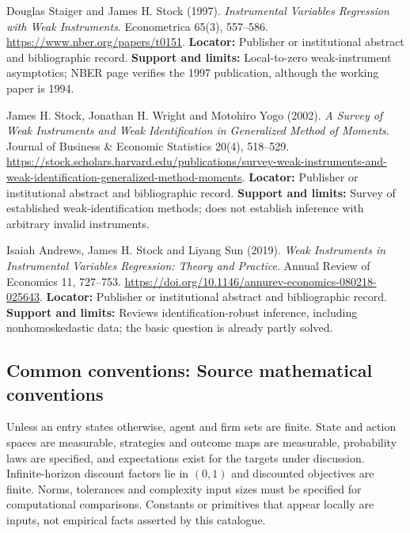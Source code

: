 \documentclass[11pt,a4paper]{article}
\begin{document}
\begin{enumerate}[label={[\textnormal{S}\arabic*]},leftmargin=*]

\item Douglas Staiger and James H. Stock (1997). \emph{Instrumental Variables Regression with Weak Instruments}. Econometrica 65(3), 557–586. \url{https://www.nber.org/papers/t0151}. \textbf{Locator:} Publisher or institutional abstract and bibliographic record. \textbf{Support and limits:} Local-to-zero weak-instrument asymptotics; NBER page verifies the 1997 publication, although the working paper is 1994.

\item James H. Stock, Jonathan H. Wright and Motohiro Yogo (2002). \emph{A Survey of Weak Instruments and Weak Identification in Generalized Method of Moments}. Journal of Business \& Economic Statistics 20(4), 518–529. \url{https://stock.scholars.harvard.edu/publications/survey-weak-instruments-and-weak-identification-generalized-method-moments}. \textbf{Locator:} Publisher or institutional abstract and bibliographic record. \textbf{Support and limits:} Survey of established weak-identification methods; does not establish inference with arbitrary invalid instruments.

\item Isaiah Andrews, James H. Stock and Liyang Sun (2019). \emph{Weak Instruments in Instrumental Variables Regression: Theory and Practice}. Annual Review of Economics 11, 727–753. \url{https://doi.org/10.1146/annurev-economics-080218-025643}. \textbf{Locator:} Publisher or institutional abstract and bibliographic record. \textbf{Support and limits:} Reviews identification-robust inference, including nonhomoskedastic data; the basic question is already partly solved.

\end{enumerate}

\subsection*{Common conventions: Source mathematical conventions}

Unless an entry states otherwise, agent and firm sets are finite. State and action spaces are measurable, strategies and outcome maps are measurable, probability laws are specified, and expectations exist for the targets under discussion. Infinite-horizon discount factors lie in $(0,1)$ and discounted objectives are finite. Norms, tolerances and complexity input sizes must be specified for computational comparisons. Constants or primitives that appear locally are inputs, not empirical facts asserted by this catalogue.
\end{document}
